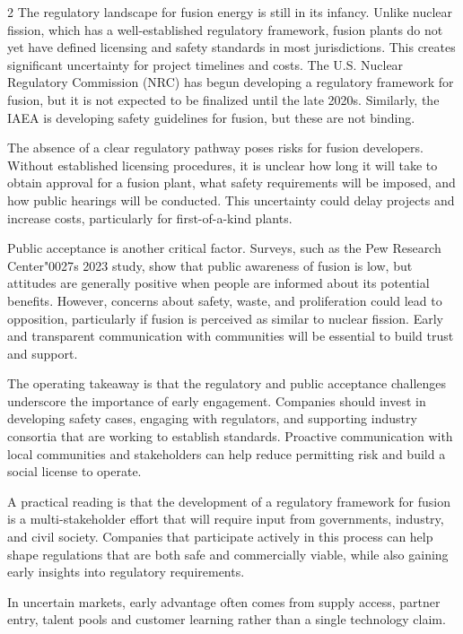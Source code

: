\documentclass[10pt,a4paper]{article}
\newcommand{\BOApos}{{\BOQuoteFont\char"0027}}
\begin{document}
\begin{multicols}{2}
{\small The regulatory landscape for fusion energy is still in its infancy. Unlike nuclear fission, which has a well-established regulatory framework, fusion plants do not yet have defined licensing and safety standards in most jurisdictions. This creates significant uncertainty for project timelines and costs. The U.S. Nuclear Regulatory Commission (NRC) has begun developing a regulatory framework for fusion, but it is not expected to be finalized until the late 2020s. Similarly, the IAEA is developing safety guidelines for fusion, but these are not binding.}\par
{\small The absence of a clear regulatory pathway poses risks for fusion developers. Without established licensing procedures, it is unclear how long it will take to obtain approval for a fusion plant, what safety requirements will be imposed, and how public hearings will be conducted. This uncertainty could delay projects and increase costs, particularly for first-of-a-kind plants.}\par
{\small Public acceptance is another critical factor. Surveys, such as the Pew Research Center\BOApos{}s 2023 study, show that public awareness of fusion is low, but attitudes are generally positive when people are informed about its potential benefits. However, concerns about safety, waste, and proliferation could lead to opposition, particularly if fusion is perceived as similar to nuclear fission. Early and transparent communication with communities will be essential to build trust and support.}\par
{\small The operating takeaway is that the regulatory and public acceptance challenges underscore the importance of early engagement. Companies should invest in developing safety cases, engaging with regulators, and supporting industry consortia that are working to establish standards. Proactive communication with local communities and stakeholders can help reduce permitting risk and build a social license to operate.}\par
{\small A practical reading is that the development of a regulatory framework for fusion is a multi-stakeholder effort that will require input from governments, industry, and civil society. Companies that participate actively in this process can help shape regulations that are both safe and commercially viable, while also gaining early insights into regulatory requirements.}\par
{\small In uncertain markets, early advantage often comes from supply access, partner entry, talent pools and customer learning rather than a single technology claim.}\par
\end{multicols}
\label{chap:5:end}
\end{document}
